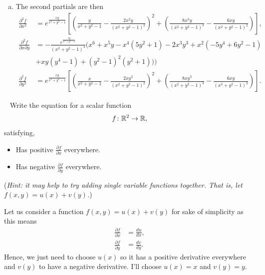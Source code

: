 \documentclass[12pt]{article} %
\begin{document}
\begin{solution}
\begin{enumerate}[(a)]
    \item The second partials are then
    \begin{align*}
    \frac{\partial^2 f}{\partial x^2} & = e^{\frac{xy}{x^2+y^2-1}}\left[\left(\frac{y}{x^2+y^2-1}-\frac{2x^2y}{(x^2+y^2-1)^2}\right)^2 +\left( \frac{8x^3y}{(x^2+y^2-1)^3}-\frac{6xy}{(x^2+y^2-1)^2}\right)\right],\\
    \frac{\partial^2 f}{\partial x \partial y}  &= -\frac{e^{\frac{x y}{x^2 + y^2 - 1}}}{(x^2 + y^2 - 1)^4} (x^6 + x^5 y - x^4 (5 y^2 + 1) - 2 x^3 y^3 + x^2 (-5 y^4 + 6 y^2 - 1) \\
        &+ x y (y^4 - 1) + (y^2 - 1)^2 (y^2 + 1)))\\
    \frac{\partial^2 f}{\partial y^2} & = e^{\frac{xy}{x^2+y^2-1}}\left[\left(\frac{x}{x^2+y^2-1}-\frac{2xy^2}{(x^2+y^2-1)^2}\right)^2 +\left( \frac{8xy^3}{(x^2+y^2-1)^3}-\frac{6xy}{(x^2+y^2-1)^2}\right)\right].
    \end{align*}
\end{enumerate}
\end{solution}

\newpage
\begin{problem}~
Write the equation for a scalar function 
    \[
    f\colon \mathbb{R}^2 \to \mathbb{R},
    \]
    satisfying,
    \begin{itemize}
        \item Has positive $\frac{\partial f}{\partial x}$ everywhere.  
        \item Has negative $\frac{\partial f}{\partial y}$ everywhere.  
    \end{itemize}
    (\emph{Hint: it may help to try adding single variable functions together. That is, let $f(x,y)=u(x)+v(y)$.})
\end{problem}
\begin{solution}
Let us consider a function $f(x,y)=u(x)+v(y)$ for sake of simplicity as this means
\begin{align*}
    \frac{\partial f}{\partial x} &= \frac{du}{dx},\\
    \frac{\partial f}{\partial y} &= \frac{dv}{dy}.
\end{align*}
Hence, we just need to choose $u(x)$ so it has a positive derivative everywhere and $v(y)$ to have a negative derivative. I'll choose $u(x)=x$ and $v(y)=y$.
\end{solution}
\end{document}
